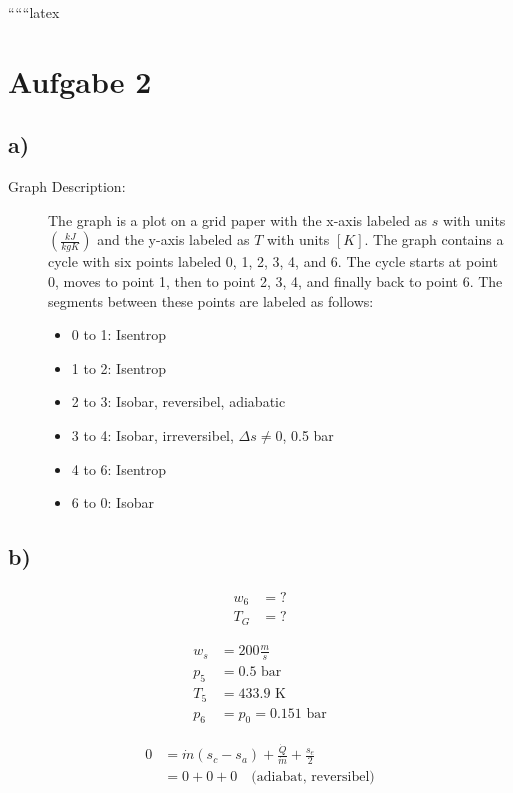 
``````latex


\section*{Aufgabe 2}

\subsection*{a)}

\begin{description}
    \item[Graph Description:] The graph is a plot on a grid paper with the x-axis labeled as $s$ with units $\left(\frac{kJ}{kgK}\right)$ and the y-axis labeled as $T$ with units $[K]$. The graph contains a cycle with six points labeled 0, 1, 2, 3, 4, and 6. The cycle starts at point 0, moves to point 1, then to point 2, 3, 4, and finally back to point 6. The segments between these points are labeled as follows:
    \begin{itemize}
        \item 0 to 1: Isentrop
        \item 1 to 2: Isentrop
        \item 2 to 3: Isobar, reversibel, adiabatic
        \item 3 to 4: Isobar, irreversibel, $\Delta s \neq 0$, 0.5 bar
        \item 4 to 6: Isentrop
        \item 6 to 0: Isobar
    \end{itemize}
\end{description}

\subsection*{b)}

\begin{align*}
    w_6 &= ? \\
    T_G &= ?
\end{align*}

\begin{align*}
    w_s &= 200 \frac{m}{s} \\
    p_5 &= 0.5 \text{ bar} \\
    T_5 &= 433.9 \text{ K} \\
    p_6 &= p_0 = 0.151 \text{ bar}
\end{align*}

\begin{align*}
    0 &= \dot{m} (s_c - s_a) + \frac{\dot{Q}}{\dot{m}} + \frac{s_e}{2} \\
    &= 0 + 0 + 0 \quad \text{(adiabat, reversibel)}
\end{align*}

